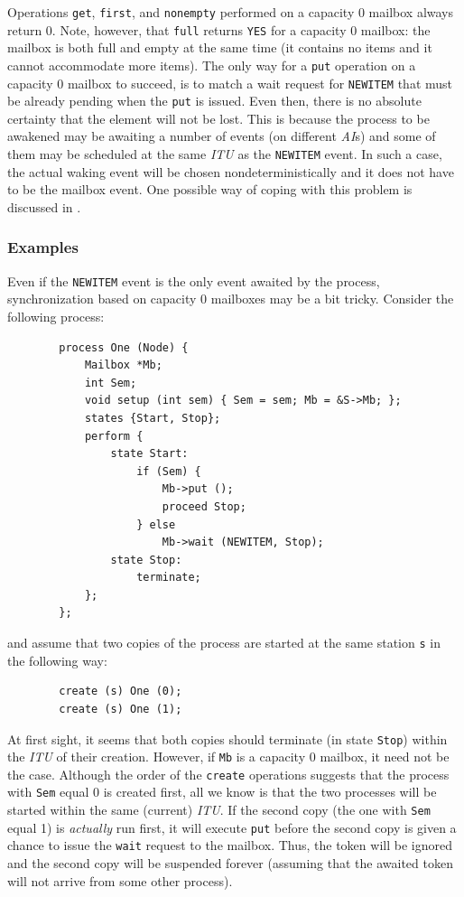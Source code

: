 Operations {\tt get}, {\tt first}, and {\tt nonempty} performed on
a capacity 0 mailbox always return 0.
Note, however, that {\tt full} returns {\tt YES} for a capacity 0 mailbox:
the mailbox is both full and empty at the same time (it contains
no items and it cannot accommodate more items).
The only way for a {\tt put} operation on a capacity 0 mailbox
to succeed, is to match a wait request for {\tt NEWITEM} that must be
already pending when the {\tt put} is issued.
Even then, there is no absolute certainty that the element will not be lost.
This is because the process to be awakened
may be awaiting a number of events (on different
{\em AI\/}s) and some of them may be scheduled at the same {\em ITU\/}
as the {\tt NEWITEM} event.
In such a case, the actual waking event will be chosen nondeterministically
and it does not have to be the mailbox event.
One possible way of coping with this problem is discussed in .

\subsubsection*{Examples}

\noindent
Even if the {\tt NEWITEM} event is the only event awaited by the process,
synchronization based on capacity 0 mailboxes may be a bit tricky.
Consider the following process:
\begin{verbatim}
        process One (Node) {
            Mailbox *Mb;
            int Sem;
            void setup (int sem) { Sem = sem; Mb = &S->Mb; };
            states {Start, Stop};
            perform {
                state Start:
                    if (Sem) {
                        Mb->put ();
                        proceed Stop;
                    } else
                        Mb->wait (NEWITEM, Stop);
                state Stop:
                    terminate;
            };
        };
\end{verbatim}
and assume that two copies of the process are started at the same station
{\tt s} in the following way:
\begin{verbatim}
        create (s) One (0);
        create (s) One (1);
\end{verbatim}

At first sight, it seems that both copies should terminate
(in state {\tt Stop}) within the {\em ITU\/} of their creation.
However, if {\tt Mb} is a capacity 0 mailbox, it need not be the case.
Although the order of the {\tt create} operations suggests that the process
with {\tt Sem} equal 0 is created first, all we know is that the two
processes will be started within the same (current) {\em ITU}.
If the second copy (the one with {\tt Sem} equal 1) is {\em actually\/}
run first, it will execute {\tt put} before the second copy is given a chance
to issue the {\tt wait} request to the mailbox.
Thus, the token will be ignored and the second copy will be suspended
forever (assuming that the awaited token will not arrive from some other
process).

